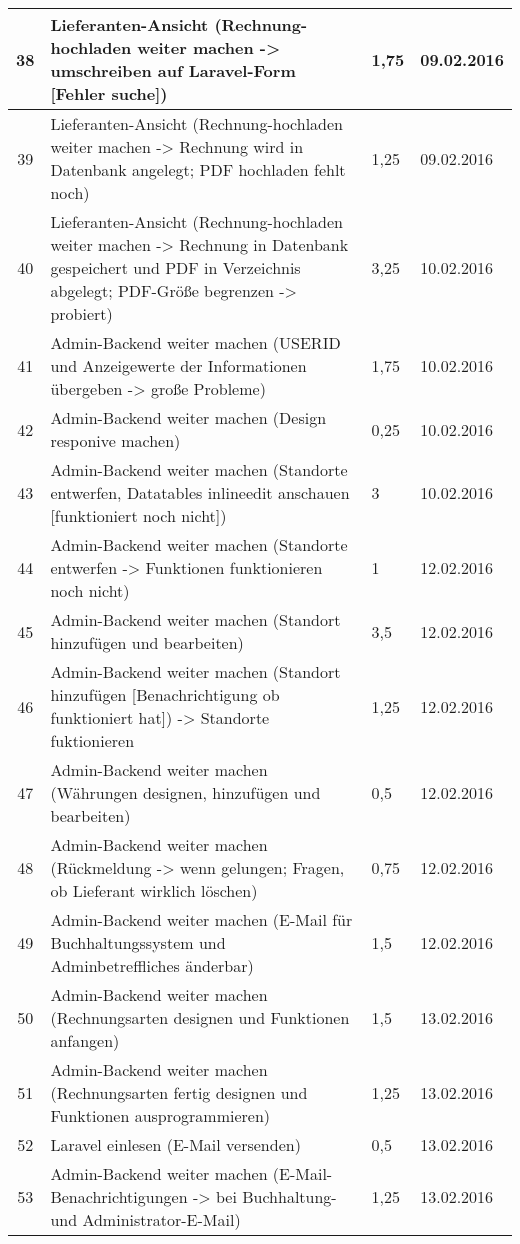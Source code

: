 \begin{longtable}[h]{| c | p{11.6cm} | l | l |}
38 & Lieferanten-Ansicht (Rechnung-hochladen weiter machen -> umschreiben auf Laravel-Form [Fehler suche]) & 1,75 & 09.02.2016 \\ \hline
39 & Lieferanten-Ansicht (Rechnung-hochladen weiter machen -> Rechnung wird in Datenbank angelegt; PDF hochladen fehlt noch) & 1,25 & 09.02.2016 \\ \hline
40 & Lieferanten-Ansicht (Rechnung-hochladen weiter machen -> Rechnung in Datenbank gespeichert und PDF in Verzeichnis abgelegt; PDF-Größe begrenzen -> probiert) & 3,25 & 10.02.2016 \\ \hline
41 & Admin-Backend weiter machen (USERID und Anzeigewerte der Informationen übergeben -> große Probleme) & 1,75 & 10.02.2016 \\ \hline
42 & Admin-Backend weiter machen (Design responive machen) & 0,25 & 10.02.2016 \\ \hline
43 & Admin-Backend weiter machen (Standorte entwerfen, Datatables inlineedit anschauen [funktioniert noch nicht]) & 3 & 10.02.2016 \\ \hline
44 & Admin-Backend weiter machen (Standorte entwerfen -> Funktionen funktionieren noch nicht) & 1 & 12.02.2016 \\ \hline
45 & Admin-Backend weiter machen (Standort hinzufügen und bearbeiten) & 3,5 & 12.02.2016 \\ \hline
46 & Admin-Backend weiter machen (Standort hinzufügen [Benachrichtigung ob funktioniert hat]) -> Standorte fuktionieren & 1,25 & 12.02.2016 \\ \hline
47 & Admin-Backend weiter machen (Währungen designen, hinzufügen und bearbeiten) & 0,5 & 12.02.2016 \\ \hline
48 & Admin-Backend weiter machen (Rückmeldung -> wenn gelungen; Fragen, ob Lieferant wirklich löschen) & 0,75 & 12.02.2016 \\ \hline
49 & Admin-Backend weiter machen (E-Mail für Buchhaltungssystem und Adminbetreffliches änderbar) & 1,5 & 12.02.2016 \\ \hline
50 & Admin-Backend weiter machen (Rechnungsarten designen und Funktionen anfangen) & 1,5 & 13.02.2016 \\ \hline
51 & Admin-Backend weiter machen (Rechnungsarten fertig designen und Funktionen ausprogrammieren) & 1,25 & 13.02.2016 \\ \hline
52 & Laravel einlesen (E-Mail versenden) & 0,5 & 13.02.2016 \\ \hline
53 & Admin-Backend weiter machen (E-Mail-Benachrichtigungen -> bei Buchhaltung- und Administrator-E-Mail) & 1,25 & 13.02.2016 \\ \hline

\end{longtable}
